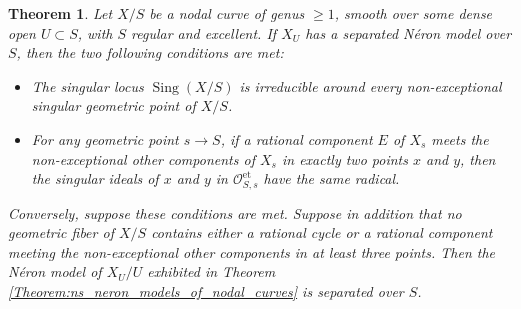 \documentclass[a4paper,10pt,twoside]{article}
\newcommand{\on}[1]{\operatorname{#1}}
\renewcommand{\O}{\mathcal{O}}
\DeclareMathOperator{\sing}{Sing}
\newtheorem{thm}{Theorem}[section]
\theoremstyle{definition}
\theoremstyle{remark}
\renewcommand{\on}[1]{\operatorname{#1}}
\begin{document}
\begin{thm}\label{Theorem:separatedness_of_nm_curves}
Let $X/S$ be a nodal curve of genus $\geq 1$, smooth over some dense open $U\subset S$, with $S$ regular and excellent. If $X_U$ has a separated N\'eron model over $S$, then the two following conditions are met:
\begin{itemize}
\item The singular locus $\sing(X/S)$ is irreducible around every non-exceptional singular geometric point of $X/S$.
\item For any geometric point $s\to S$, if a rational component $E$ of $X_s$ meets the non-exceptional other components of $X_s$ in exactly two points $x$ and $y$, then the singular ideals of $x$ and $y$ in $\O_{S,s}^{\on{et}}$ have the same radical.
\end{itemize}

Conversely, suppose these conditions are met. Suppose in addition that no geometric fiber of $X/S$ contains either a rational cycle or a rational component meeting the non-exceptional other components in at least three points. Then the N\'eron model of $X_U/U$ exhibited in Theorem \ref{Theorem:ns_neron_models_of_nodal_curves} is separated over $S$.
\end{thm}
\end{document}
